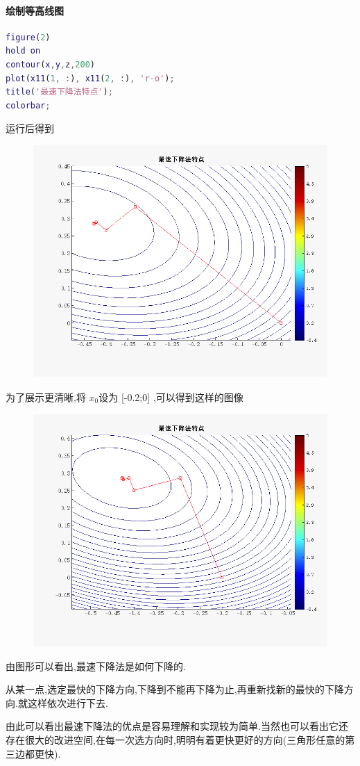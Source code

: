 \documentclass{xtupaper}
\begin{document}
\newpage
\paragraph{绘制等高线图}
\begin{lstlisting}[language=matlab]
figure(2)
hold on 
contour(x,y,z,200)
plot(x11(1, :), x11(2, :), 'r-o');
title('最速下降法特点');
colorbar;
\end{lstlisting}
运行后得到
\begin{figure}[ht]
  \centering
  \includegraphics[scale=0.5]{../figures/fig4.png}
  \caption{}
\end{figure}

为了展示更清晰,将 $ x_0 $设为 [-0.2;0] ,可以得到这样的图像
\begin{figure}[ht]
  \centering
  \includegraphics[scale=0.5]{../figures/fig5.png}
  \caption{}
\end{figure}


由图形可以看出,最速下降法是如何下降的.

从某一点,选定最快的下降方向,下降到不能再下降为止,再重新找新的最快的下降方向.就这样依次进行下去.

由此可以看出最速下降法的优点是容易理解和实现较为简单.当然也可以看出它还存在很大的改进空间,在每一次选方向时,明明有着更快更好的方向(三角形任意的第三边都更快).
\end{document}
